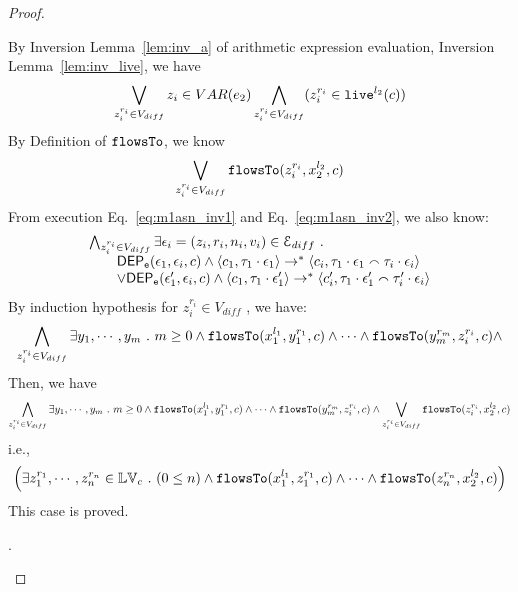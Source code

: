 \begin{proof}
\begin{case}
\begin{subcase}
\begin{subsubcase}
\begin{subsubsubcase}
%
By {Inversion Lemma~\ref{lem:inv_a}} of arithmetic expression evaluation, Inversion Lemma~\ref{lem:inv_live}, we have 
%
\[
  \bigvee_{z_i^{r_i} \in V_{diff}} z_i \in VAR(e_2)
  \bigwedge_{z_i^{r_i} \in V_{diff}} (z_i^{r_i} \in \mathtt{live}^{l_2}(c))
\]
%
%
By Definition of $\mathtt{flowsTo}$, we know
\[
   \bigvee_{z_i^{r_i} \in V_{diff}}  \mathtt{flowsTo}(z_i^{r_i}, x_2^{l_2}, c)
\]
%
From execution Eq.~\ref{eq:m1asn_inv1} and Eq.~\ref{eq:m1asn_inv2}, we also know:
\[
\begin{array}{l}
  \bigwedge_{z_i^{r_i} \in V_{diff}}
  \exists \mathtt{\epsilon}_i = (z_i, r_i, n_i, v_i) 
  \in \mathcal{E}_{diff} 
  ~.~ 
  \\ \qquad 
  \mathsf{DEP_{\mathtt{e}}}(\mathtt{\epsilon}_1, \mathtt{\epsilon}_i, c) \land 
  \langle c_1, \mathtt{\tau}_1 \cdot \mathtt{\epsilon}_1 \rangle 
  \rightarrow^{*}
  \langle {c}_i,  \mathtt{\tau}_1 \cdot \mathtt{\epsilon}_1 \smallfrown \mathtt{\tau}_{i} \cdot \mathtt{\epsilon}_{i} \rangle
  \\ \qquad 
  \lor
  \mathsf{DEP_{\mathtt{e}}}(\mathtt{\epsilon}_1', \mathtt{\epsilon}_i, c) \land 
  \langle c_1, \mathtt{\tau}_1 \cdot \mathtt{\epsilon}_1' \rangle 
  \rightarrow^{*} 
  \langle {c}_i',  \mathtt{\tau}_1 \cdot \mathtt{\epsilon}_1' \smallfrown \mathtt{\tau}_{i}' \cdot \mathtt{\epsilon}_{i} \rangle
\end{array}
\]
%
By induction hypothesis for $z_i^{r_i} \in V_{diff}$ , we have:
\[
  \bigwedge_{z_i^{r_i} \in V_{diff}}
  \exists y_1, \cdots, y_m ~.~ 
  m \geq 0 \land
  \mathtt{flowsTo}(x_1^{l_1}, y_1^{r_1}, c) \land \cdots \land \mathtt{flowsTo}(y_m^{r_m}, z_i^{r_i}, c) \land 
\]
%
Then, we have
\[
  \bigwedge_{z_i^{r_i} \in V_{diff}}
  \exists y_1, \cdots, y_m ~.~ 
  m \geq 0 \land
  \mathtt{flowsTo}(x_1^{l_1}, y_1^{r_1}, c) \land \cdots \land \mathtt{flowsTo}(y_m^{r_m}, z_i^{r_i}, c) \land 
   \bigvee_{z_i^{r_i} \in V_{diff}}  \mathtt{flowsTo}(z_i^{r_i}, x_2^{l_2}, c)
\]
i.e.,
\[
\Big(\exists z_1^{r_1}, \cdots, z_n^{r_n} \in \mathbb{LV}_{{c}} ~.~ (0 \leq n  )
 \land \mathtt{flowsTo}(x_1^{l_1}, z_1^{r_1}, c) \land \cdots \land \mathtt{flowsTo}(z_n^{r_n}, {x}_2^{l_2}, c) \Big)
\]
This case is proved.
%
%
\end{subsubsubcase}
\end{subsubcase}
\end{subcase}
%
\begin{subcase}.

\end{subcase}
\end{case}
\end{proof}
